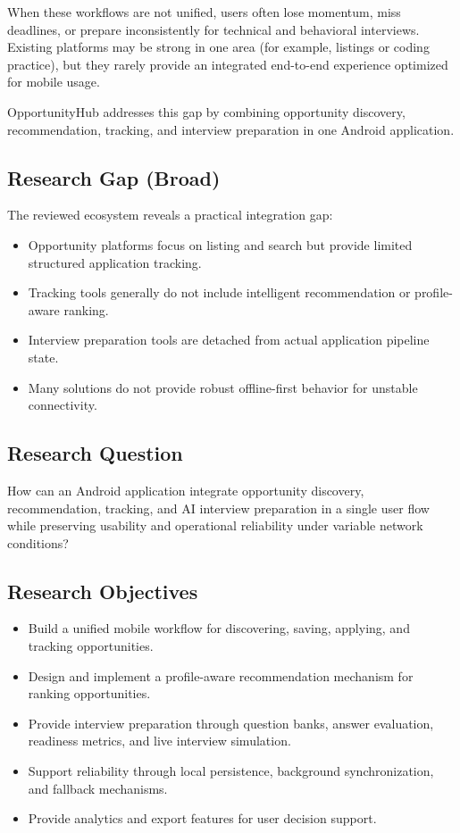 \documentclass[conference]{IEEEtran}
\begin{document}
When these workflows are not unified, users often lose momentum, miss deadlines, or prepare inconsistently for technical and behavioral interviews. Existing platforms may be strong in one area (for example, listings or coding practice), but they rarely provide an integrated end-to-end experience optimized for mobile usage.

OpportunityHub addresses this gap by combining opportunity discovery, recommendation, tracking, and interview preparation in one Android application.

\subsection{Research Gap (Broad)}

The reviewed ecosystem reveals a practical integration gap:

\begin{itemize}
  \item Opportunity platforms focus on listing and search but provide limited structured application tracking.
  \item Tracking tools generally do not include intelligent recommendation or profile-aware ranking.
  \item Interview preparation tools are detached from actual application pipeline state.
  \item Many solutions do not provide robust offline-first behavior for unstable connectivity.
\end{itemize}

\subsection{Research Question}

How can an Android application integrate opportunity discovery, recommendation, tracking, and AI interview preparation in a single user flow while preserving usability and operational reliability under variable network conditions?

\subsection{Research Objectives}

\begin{itemize}
  \item Build a unified mobile workflow for discovering, saving, applying, and tracking opportunities.
  \item Design and implement a profile-aware recommendation mechanism for ranking opportunities.
  \item Provide interview preparation through question banks, answer evaluation, readiness metrics, and live interview simulation.
  \item Support reliability through local persistence, background synchronization, and fallback mechanisms.
  \item Provide analytics and export features for user decision support.
\end{itemize}
\end{document}
